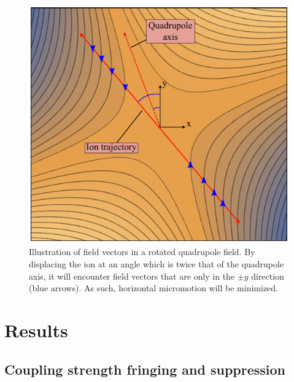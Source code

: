 \begin{figure}[t]
    \begin{center}
        \includegraphics{figures/4/Fig_Quadrupole}
        \caption{\label{fig:quadrupole} Illustration of field vectors in a rotated quadrupole field. By displacing the ion at an angle which is twice that of the quadrupole axis, it will encounter field vectors that are only in the $\pm y$ direction (blue arrows). As such, horizontal micromotion will be minimized.  }
    \end{center}
\end{figure}






\section{Results}


\subsection{Coupling strength fringing and suppression}


